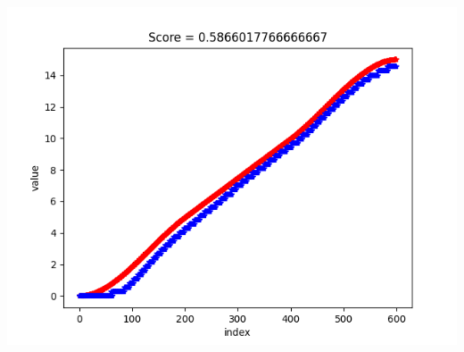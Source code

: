 \documentclass{article}
\begin{document}
\begin{enumerate}[label=\textbf{\arabic*})]
        \includegraphics[width=\linewidth]{cubic.png}
\end{enumerate}
\end{document}
